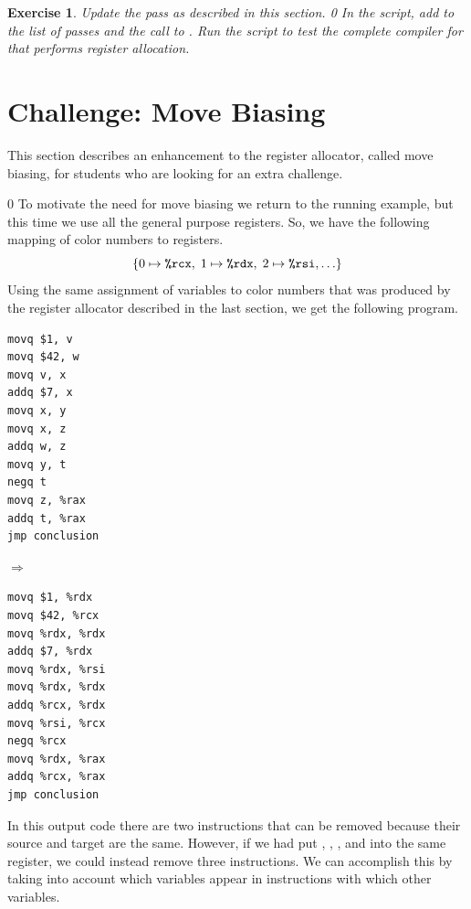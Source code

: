 \documentclass[7x10]{TimesAPriori_MIT}%
\def\racketEd{0}
\def\edition{1}
\newcommand{\racket}[1]{{\if\edition\racketEd{#1}\fi}}
\newtheorem{exercise}[theorem]{Exercise}
\numberwithin{theorem}{chapter}
\numberwithin{definition}{chapter}
\numberwithin{equation}{chapter}
\begin{document}
\begin{exercise}\normalfont\normalsize
Update the  pass as described in this section.
%
\racket{
In the  script, add \code{prelude\_and\_conclusion} to the
list of passes and the call to \code{compiler-tests}.}
%
Run the script to test the complete compiler for \LangVar{} that
performs register allocation.
\end{exercise}

\section{Challenge: Move Biasing}
\label{sec:move-biasing}

This section describes an enhancement to the register allocator,
called move biasing, for students who are looking for an extra
challenge.

{\if\edition\racketEd      
To motivate the need for move biasing we return to the running example,
but this time we use all the general purpose registers. So, we have
the following mapping of color numbers to registers.
\[
  \{ 0 \mapsto \texttt{\%rcx}, \; 1 \mapsto \texttt{\%rdx}, \; 2 \mapsto \texttt{\%rsi}, \ldots \}
\]
Using the same assignment of variables to color numbers that was
produced by the register allocator described in the last section, we
get the following program.
\begin{center}
\begin{minipage}{0.35\textwidth}
\begin{lstlisting}
movq $1, v
movq $42, w
movq v, x
addq $7, x
movq x, y
movq x, z
addq w, z
movq y, t
negq t
movq z, %rax
addq t, %rax
jmp conclusion
\end{lstlisting}
\end{minipage}
$\Rightarrow\qquad$
\begin{minipage}{0.45\textwidth}
\begin{lstlisting}
movq $1, %rdx
movq $42, %rcx
movq %rdx, %rdx
addq $7, %rdx
movq %rdx, %rsi
movq %rdx, %rdx
addq %rcx, %rdx
movq %rsi, %rcx
negq %rcx
movq %rdx, %rax
addq %rcx, %rax
jmp conclusion
\end{lstlisting}
\end{minipage}
\end{center}
In this output code there are two  instructions that
can be removed because their source and target are the same.  However,
if we had put , , , and  into the same
register, we could instead remove three  instructions.  We
can accomplish this by taking into account which variables appear in
 instructions with which other variables.
\fi}
\end{document}
